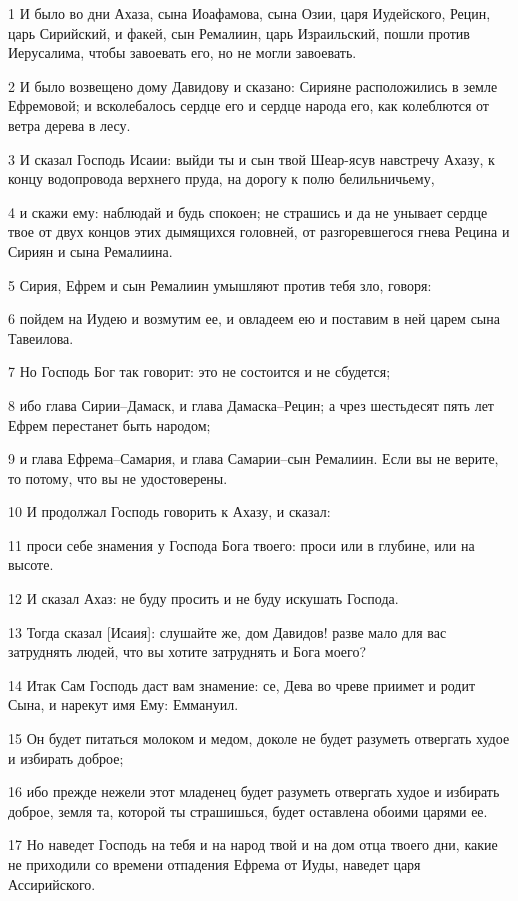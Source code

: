 \par 1 И было во дни Ахаза, сына Иоафамова, сына Озии, царя Иудейского, Рецин, царь Сирийский, и факей, сын Ремалиин, царь Израильский, пошли против Иерусалима, чтобы завоевать его, но не могли завоевать.
\par 2 И было возвещено дому Давидову и сказано: Сирияне расположились в земле Ефремовой; и всколебалось сердце его и сердце народа его, как колеблются от ветра дерева в лесу.
\par 3 И сказал Господь Исаии: выйди ты и сын твой Шеар-ясув навстречу Ахазу, к концу водопровода верхнего пруда, на дорогу к полю белильничьему,
\par 4 и скажи ему: наблюдай и будь спокоен; не страшись и да не унывает сердце твое от двух концов этих дымящихся головней, от разгоревшегося гнева Рецина и Сириян и сына Ремалиина.
\par 5 Сирия, Ефрем и сын Ремалиин умышляют против тебя зло, говоря:
\par 6 пойдем на Иудею и возмутим ее, и овладеем ею и поставим в ней царем сына Тавеилова.
\par 7 Но Господь Бог так говорит: это не состоится и не сбудется;
\par 8 ибо глава Сирии--Дамаск, и глава Дамаска--Рецин; а чрез шестьдесят пять лет Ефрем перестанет быть народом;
\par 9 и глава Ефрема--Самария, и глава Самарии--сын Ремалиин. Если вы не верите, то потому, что вы не удостоверены.
\par 10 И продолжал Господь говорить к Ахазу, и сказал:
\par 11 проси себе знамения у Господа Бога твоего: проси или в глубине, или на высоте.
\par 12 И сказал Ахаз: не буду просить и не буду искушать Господа.
\par 13 Тогда сказал [Исаия]: слушайте же, дом Давидов! разве мало для вас затруднять людей, что вы хотите затруднять и Бога моего?
\par 14 Итак Сам Господь даст вам знамение: се, Дева во чреве приимет и родит Сына, и нарекут имя Ему: Еммануил.
\par 15 Он будет питаться молоком и медом, доколе не будет разуметь отвергать худое и избирать доброе;
\par 16 ибо прежде нежели этот младенец будет разуметь отвергать худое и избирать доброе, земля та, которой ты страшишься, будет оставлена обоими царями ее.
\par 17 Но наведет Господь на тебя и на народ твой и на дом отца твоего дни, какие не приходили со времени отпадения Ефрема от Иуды, наведет царя Ассирийского.
